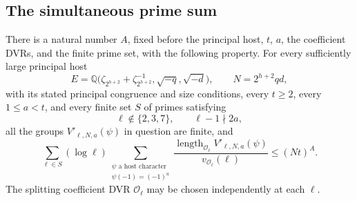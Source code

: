 \subsection{The simultaneous prime sum}
\begin{srtheorem}\label{thm:sr-generic-character-estimate}
There is a natural number \(A\), fixed before
the principal host, \(t\), \(a\), the coefficient
DVRs, and the finite prime set, with the following
property.
For every sufficiently large principal host
\[
 E=\mathbb Q\bigl(
   \zeta_{2^{h+2}}+\zeta_{2^{h+2}}^{-1},
                  \sqrt{-q},\sqrt{-d}\bigr),\qquad
 N=2^{h+2}qd,
\]
with its stated principal congruence and size
conditions, every \(t\ge2\), every \(1\le a<t\),
and every finite set \(S\) of primes satisfying
\[
          \ell\notin\{2,3,7\},\qquad \ell-1\nmid2a,
\]
all the groups \(V'_{\ell,N,a}(\psi)\) in question
are finite, and
\[
 \sum_{\ell\in S}(\log\ell)
        \sum_{\substack{\psi\text{ a host character}\\
                        \psi(-1)=(-1)^a}}
 \frac{\operatorname{length}_{\mathcal O_\ell}
                    V'_{\ell,N,a}(\psi)}
                  {v_{\mathcal O_\ell}(\ell)}
                              \le (Nt)^A .                \tag{GC11}
\]
The splitting coefficient DVR \(\mathcal O_\ell\)
may be chosen independently at each \(\ell\).
\end{srtheorem}

